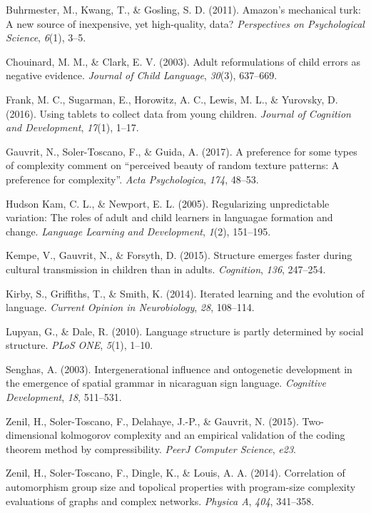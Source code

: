 \documentclass[10pt, letterpaper]{article}
\begin{document}
\setlength{\parindent}{-0.1in} \setlength{\leftskip}{0.125in}

\noindent

\hypertarget{refs}{}
\hypertarget{ref-buhrmester-2011}{}
Buhrmester, M., Kwang, T., \& Gosling, S. D. (2011). Amazon's mechanical
turk: A new source of inexpensive, yet high-quality, data?
\emph{Perspectives on Psychological Science}, \emph{6}(1), 3--5.

\hypertarget{ref-chouinard-2003}{}
Chouinard, M. M., \& Clark, E. V. (2003). Adult reformulations of child
errors as negative evidence. \emph{Journal of Child Language},
\emph{30}(3), 637--669.

\hypertarget{ref-frank-2016}{}
Frank, M. C., Sugarman, E., Horowitz, A. C., Lewis, M. L., \& Yurovsky,
D. (2016). Using tablets to collect data from young children.
\emph{Journal of Cognition and Development}, \emph{17}(1), 1--17.

\hypertarget{ref-gauvrit-2017}{}
Gauvrit, N., Soler-Toscano, F., \& Guida, A. (2017). A preference for
some types of complexity comment on ``perceived beauty of random texture
patterns: A preference for complexity''. \emph{Acta Psychologica},
\emph{174}, 48--53.

\hypertarget{ref-hudsonkam-2005}{}
Hudson Kam, C. L., \& Newport, E. L. (2005). Regularizing unpredictable
variation: The roles of adult and child learners in languagae formation
and change. \emph{Language Learning and Development}, \emph{1}(2),
151--195.

\hypertarget{ref-kempe-2015}{}
Kempe, V., Gauvrit, N., \& Forsyth, D. (2015). Structure emerges faster
during cultural transmission in children than in adults.
\emph{Cognition}, \emph{136}, 247--254.

\hypertarget{ref-kirby-2014}{}
Kirby, S., Griffiths, T., \& Smith, K. (2014). Iterated learning and the
evolution of language. \emph{Current Opinion in Neurobiology},
\emph{28}, 108--114.

\hypertarget{ref-lupyan-2010}{}
Lupyan, G., \& Dale, R. (2010). Language structure is partly determined
by social structure. \emph{PLoS ONE}, \emph{5}(1), 1--10.

\hypertarget{ref-senghas-2003}{}
Senghas, A. (2003). Intergenerational influence and ontogenetic
development in the emergence of spatial grammar in nicaraguan sign
language. \emph{Cognitive Development}, \emph{18}, 511--531.

\hypertarget{ref-zenil-2015}{}
Zenil, H., Soler-Toscano, F., Delahaye, J.-P., \& Gauvrit, N. (2015).
Two-dimensional kolmogorov complexity and an empirical validation of the
coding theorem method by compressibility. \emph{PeerJ Computer Science},
\emph{e23}.

\hypertarget{ref-zenil-2014}{}
Zenil, H., Soler-Toscano, F., Dingle, K., \& Louis, A. A. (2014).
Correlation of automorphism group size and topolical properties with
program-size complexity evaluations of graphs and complex networks.
\emph{Physica A}, \emph{404}, 341--358.
\end{document}
